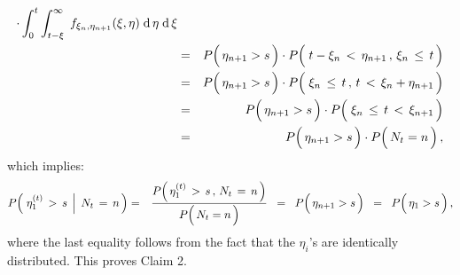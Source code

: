 \begin{eqnarray*}
	\cdot
	\int_{0}^{t}\int_{t-\xi}^{\infty}\;
		f_{\xi_{n},\eta_{n+1}}(\xi,\eta)
		\;\d\,\eta\;\d\,\xi
\\
& = &
	P\!\left(\,\eta_{n+1} \overset{{\color{white}.}}{>} s\,\right)
	\cdot
	P\!\left(\;
		t-\xi_{n}\,<\,\eta_{n+1}
		\,,\,
		\xi_{n} \,\overset{{\color{white}.}}{\leq}\, t
		\,\right)
\\
& = &
	P\!\left(\,\eta_{n+1} \overset{{\color{white}.}}{>} s\,\right)
	\cdot
	P\!\left(\;
		\xi_{n} \,\overset{{\color{white}.}}{\leq}\, t
		\,,\,
		t\,<\,\xi_{n}+\eta_{n+1}
		\,\right)
\\
& = &
	P\!\left(\,\eta_{n+1} \overset{{\color{white}.}}{>} s\,\right)
	\cdot
	P\!\left(\;
		\xi_{n} \,\overset{{\color{white}.}}{\leq}\, t \,<\,\xi_{n+1}
		\,\right)
\\
& = &
	P\!\left(\,\eta_{n+1} \overset{{\color{white}.}}{>} s\,\right)
	\cdot
	P\!\left(\,N_{t} \overset{{\color{white}-}}{=} n \,\right),
\end{eqnarray*}
which implies:
\begin{eqnarray*}
P\!\left(\,\left.\eta^{(t)}_{1}\,>\,s\;\,\right\vert\;N_{t}\,=\,n\,\right)
& = &
	\dfrac{
		P\!\left(\,\eta^{(t)}_{1}\,>\,s\,,\,N_{t}\,=\,n\,\right)
		}{
		P\!\left(\,N_{t} \overset{{\color{white}-}}{=} n \,\right)
		}
\;\; = \;\;
	P\!\left(\,\eta_{n+1} \overset{{\color{white}.}}{>} s\,\right)
\;\; = \;\;
	P\!\left(\,\eta_{1} \overset{{\color{white}.}}{>} s\,\right),
\end{eqnarray*}
where the last equality follows from the fact that the $\eta_{i}$'s
are identically distributed.
This proves Claim 2.

